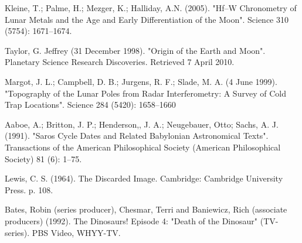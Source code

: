 \documentclass{article}
\begin{document}
\begin{thebibliography}{9}

 Kleine, T.; Palme, H.; Mezger, K.; Halliday, A.N. (2005). "Hf–W Chronometry of Lunar Metals and the Age and Early Differentiation of the Moon". Science 310 (5754): 1671–1674.

Taylor, G. Jeffrey (31 December 1998). "Origin of the Earth and Moon". Planetary Science Research Discoveries. Retrieved 7 April 2010.

Margot, J. L.; Campbell, D. B.; Jurgens, R. F.; Slade, M. A. (4 June 1999). "Topography of the Lunar Poles from Radar Interferometry: A Survey of Cold Trap Locations". Science 284 (5420): 1658–1660

 Aaboe, A.; Britton, J. P.; Henderson,, J. A.; Neugebauer, Otto; Sachs, A. J. (1991). "Saros Cycle Dates and Related Babylonian Astronomical Texts". Transactions of the American Philosophical Society (American Philosophical Society) 81 (6): 1–75.

 Lewis, C. S. (1964). The Discarded Image. Cambridge: Cambridge University Press. p. 108.

Bates, Robin (series producer), Chesmar, Terri and Baniewicz, Rich (associate producers) (1992). The Dinosaurs! Episode 4: "Death of the Dinosaur" (TV-series). PBS Video, WHYY-TV.

\end{thebibliography}
\end{document}
